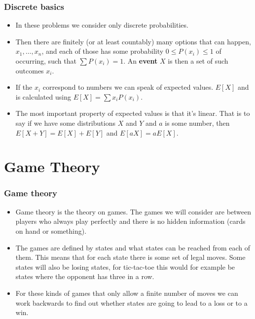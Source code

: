 \documentclass{beamer}
\begin{document}
\begin{frame}[plain]
\frametitle{Discrete basics}

\begin{itemize}

\item In these problems we consider only discrete probabilities.

\item Then there are finitely (or at least countably) many options that can happen, $x_1, \dots, x_n$, and each of those has some probability $0 \leq P(x_i) \leq 1$ of occurring, such that $\sum P(x_i) = 1$. An \textbf{event} $X$ is then a set of such outcomes $x_i$.

\item If the $x_i$ correspond to numbers we can speak of expected values. $E[X]$ and is calculated using $E[X] = \sum x_i P(x_i)$.

\item The most important property of expected values is that it's linear. That is to say if we have some distributions $X$ and $Y$ and $a$ is some number, then $E[X + Y] = E[X] + E[Y]$ and $E[aX] = aE[X]$.

\end{itemize}

\end{frame}

\section*{Game Theory}

\begin{frame}[plain]
\frametitle{Game theory}

\begin{itemize}

\item Game theory is the theory on games. The games we will consider are between players who always play perfectly and there is no hidden information (cards on hand or something).

\item The games are defined by states and what states can be reached from each of them. This means that for each state there is some set of legal moves. Some states will also be losing states, for tic-tac-toe this would for example be states where the opponent has three in a row.

\item For these kinds of games that only allow a finite number of moves we can work backwards to find out whether states are going to lead to a loss or to a win.

\end{itemize}

\end{frame}
\end{document}
